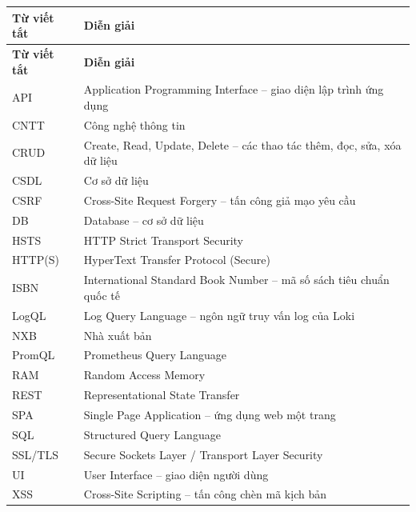 \documentclass[../main.tex]{subfiles}
\begin{document}
\begin{longtable}{|p{3.2cm}|p{11cm}|}
\hline
\textbf{Từ viết tắt} & \textbf{Diễn giải} \\
\hline
\endfirsthead
\hline
\textbf{Từ viết tắt} & \textbf{Diễn giải} \\
\hline
\endhead
API & Application Programming Interface -- giao diện lập trình ứng dụng \\ \hline
CNTT & Công nghệ thông tin \\ \hline
CRUD & Create, Read, Update, Delete -- các thao tác thêm, đọc, sửa, xóa dữ liệu \\ \hline
CSDL & Cơ sở dữ liệu \\ \hline
CSRF & Cross-Site Request Forgery -- tấn công giả mạo yêu cầu \\ \hline
DB & Database -- cơ sở dữ liệu \\ \hline
HSTS & HTTP Strict Transport Security \\ \hline
HTTP(S) & HyperText Transfer Protocol (Secure) \\ \hline
ISBN & International Standard Book Number -- mã số sách tiêu chuẩn quốc tế \\ \hline
LogQL & Log Query Language -- ngôn ngữ truy vấn log của Loki \\ \hline
NXB & Nhà xuất bản \\ \hline
PromQL & Prometheus Query Language \\ \hline
RAM & Random Access Memory \\ \hline
REST & Representational State Transfer \\ \hline
SPA & Single Page Application -- ứng dụng web một trang \\ \hline
SQL & Structured Query Language \\ \hline
SSL/TLS & Secure Sockets Layer / Transport Layer Security \\ \hline
UI & User Interface -- giao diện người dùng \\ \hline
XSS & Cross-Site Scripting -- tấn công chèn mã kịch bản \\ \hline
\end{longtable}
\end{document}
